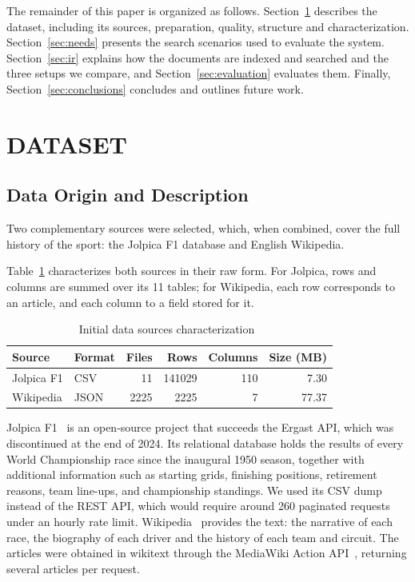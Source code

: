 \documentclass[sigconf]{acmart}
\begin{document}
The remainder of this paper is organized as follows.
Section~\ref{sec:dataset} describes the dataset, including its sources,
preparation, quality, structure and characterization.
Section~\ref{sec:needs} presents the search scenarios used to evaluate the
system. Section~\ref{sec:ir} explains how the documents are indexed and
searched and the three setups we compare, and Section~\ref{sec:evaluation}
evaluates them. Finally, Section~\ref{sec:conclusions} concludes and
outlines future work.

\section{DATASET}
\label{sec:dataset}

\subsection{Data Origin and Description}
\label{sec:sources}
Two complementary sources were selected, which, when combined, cover the full history of
the sport: the Jolpica F1 database and English Wikipedia.

Table~\ref{tab:sources} characterizes both sources in their raw form. For Jolpica, rows and columns are summed over its 11 tables; for Wikipedia, each row corresponds to
an article, and each column to a field stored for it.

\begin{table}[ht]
  \small
  \begin{tabular}{llrrrr}
    \toprule
    Source & Format & Files & Rows & Columns & Size (MB) \\
    \midrule
    Jolpica F1 & CSV & 11 & 141029 & 110 & 7.30 \\
    Wikipedia & JSON & 2225 & 2225 & 7 & 77.37 \\
    \bottomrule
  \end{tabular}
  \caption{Initial data sources characterization~\cite{jolpica,wikipedia}}
  \label{tab:sources}
\end{table}

Jolpica F1~\cite{jolpica} is an open-source project that succeeds the Ergast
API, which was discontinued at the end of 2024. Its relational database holds the
results of every World Championship race since the inaugural 1950 season, together with additional information such as starting
grids, finishing positions, retirement reasons, team line-ups, and
championship standings. We used its CSV dump instead of the REST API, which
would require around 260 paginated requests under an hourly rate limit.
Wikipedia~\cite{wikipedia} provides the text: the narrative of each race,
the biography of each driver and the history of each team and circuit. The
articles were obtained in wikitext through the MediaWiki Action
API~\cite{mediawikiapi}, returning several articles per request.
\end{document}
